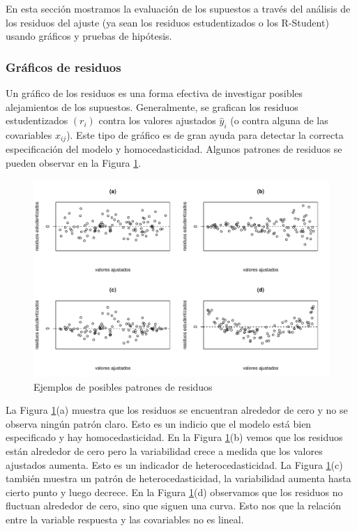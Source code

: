 \documentclass[
]{article}
\begin{document}
En esta sección mostramos la evaluación de los supuestos a través del análisis de los residuos del ajuste (ya sean los residuos estudentizados o los R-Student) usando gráficos y pruebas de hipótesis.

\hypertarget{gruxe1ficos-de-residuos}{%
\subsubsection{Gráficos de residuos}\label{gruxe1ficos-de-residuos}}

Un gráfico de los residuos es una forma efectiva de investigar posibles alejamientos de los supuestos. Generalmente, se grafican los residuos estudentizados \((r_{i})\) contra los valores ajustados \(\widehat{y}_{i}\) (o contra alguna de las covariables \(x_{ij}\)). Este tipo de gráfico es de gran ayuda para detectar la correcta especificación del modelo y homocedasticidad. Algunos patrones de residuos se pueden observar en la Figura \ref{fig:PatronesResiduos}.

\begin{figure}

{\centering \includegraphics{MLG1_files/figure-latex/PatronesResiduos-1} 

}

\caption{Ejemplos de posibles patrones de residuos}\label{fig:PatronesResiduos}
\end{figure}

La Figura \ref{fig:PatronesResiduos}(a) muestra que los residuos se encuentran alrededor de cero y no se observa ningún patrón claro. Esto es un indicio que el modelo está bien especificado y hay homocedasticidad. En la Figura \ref{fig:PatronesResiduos}(b) vemos que los residuos están alrededor de cero pero la variabilidad crece a medida que los valores ajustados aumenta. Esto es un indicador de heterocedasticidad. La Figura \ref{fig:PatronesResiduos}(c) también muestra un patrón de heterocedasticidad, la variabilidad aumenta hasta cierto punto y luego decrece. En la Figura \ref{fig:PatronesResiduos}(d) observamos que los residuos no fluctuan alrededor de cero, sino que siguen una curva. Esto nos que la relación entre la variable respuesta y las covariables no es lineal.
\end{document}
